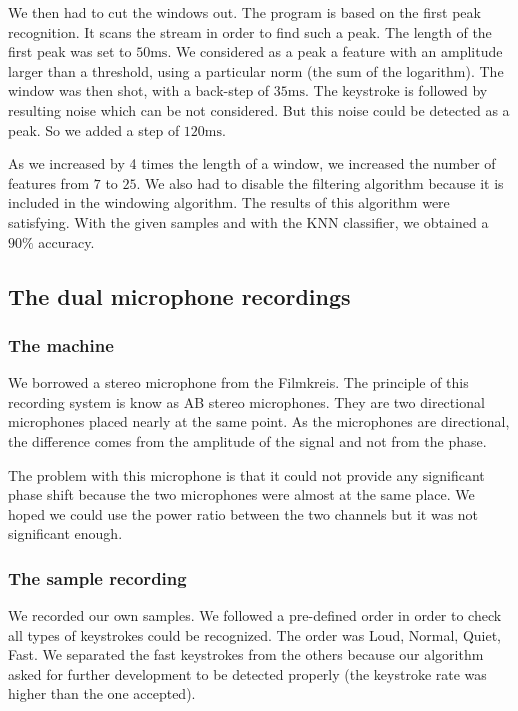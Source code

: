 \documentclass[12pt,a4paper]{article}
\begin{document}
We then had to cut the windows out. The program is based on the first peak recognition. It scans the stream in order to find such a peak. 
The length of the first peak was set to $50 \mathrm{ms}$. We considered as a peak a feature with an amplitude larger than a threshold, using a particular norm (the sum of the logarithm). 
The window was then shot, with a back-step of $35 \mathrm{ms}$. 
The keystroke is followed by resulting noise which can be not considered. But this noise could be detected as a peak. So we added a step of $120 \mathrm{ms}$. 

As we increased by 4 times the length of a window, we increased the number of features from $7$ to $25$. We also had to disable the filtering algorithm because it is included in the windowing algorithm. 
The results of this algorithm were satisfying. With the given samples and with the KNN classifier, we obtained a $90 \%$ accuracy. 


\subsection{The dual microphone recordings}

\subsubsection{The machine}

We borrowed a stereo microphone from the Filmkreis. 
The principle of this recording system is know as AB stereo microphones. They are two directional microphones placed nearly at the same point. As the microphones are directional, the difference comes from the amplitude of the signal and not from the phase. 

The problem with this microphone is that it could not provide any significant phase shift because the two microphones were almost at the same place. 
We hoped we could use the power ratio between the two channels but it was not significant enough. 

\subsubsection{The sample recording}

We recorded our own samples. We followed a pre-defined order in order to check all types of keystrokes could be recognized. The order was Loud, Normal, Quiet, Fast. We separated the fast keystrokes from the others because our algorithm asked for further development to be detected properly (the keystroke rate was higher than the one accepted). 
\end{document}
